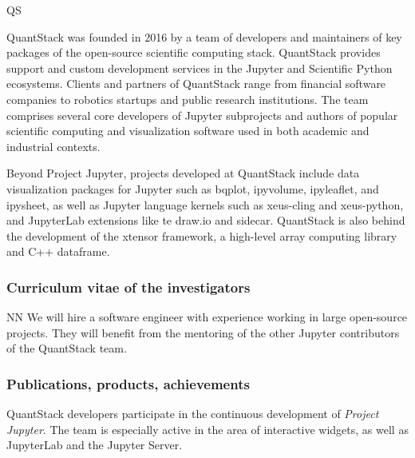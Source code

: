 \begin{sitedescription}{QS}

\par QuantStack was founded in 2016 by a team of developers and maintainers of key packages of the open-source scientific computing stack. QuantStack provides support and custom development services in the Jupyter and Scientific Python ecosystems. Clients and partners of QuantStack range from financial software companies to robotics startups and public research institutions. The team comprises several core developers of Jupyter subprojects and authors of popular scientific computing and visualization software used in both academic and industrial contexts.

\par Beyond Project Jupyter, projects developed at QuantStack include data visualization packages for Jupyter such as bqplot, ipyvolume, ipyleaflet, and ipysheet, as well as Jupyter language kernels such as xeus-cling and xeus-python, and JupyterLab extensions like te draw.io and sidecar. QuantStack is also behind the development of the xtensor framework, a high-level array computing library and C++ dataframe.

\subsubsection*{Curriculum vitae of the investigators}






\begin{participant}[type=res,PM=41,salary=7000]{NN} %
  We will hire a software engineer with experience working in large open-source
  projects. They will benefit from the mentoring of the other Jupyter contributors
  of the QuantStack team.
\end{participant}

\subsubsection*{Publications, products, achievements}

\begin{compactenum}

\item QuantStack developers participate in the continuous development of \emph{Project Jupyter}. The team is especially active in the area of interactive widgets, as well as JupyterLab and the Jupyter Server.


\end{compactenum}
\end{sitedescription}
